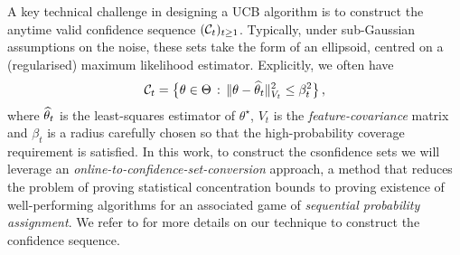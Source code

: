 A key technical challenge in designing a UCB algorithm is to construct the anytime valid confidence sequence $(\mathcal{C}_t)_{t\geq 1}$. Typically, under sub-Gaussian assumptions on the noise, these sets take the form of an ellipsoid, centred on a (regularised) maximum likelihood estimator. Explicitly, we often have
$$\mathcal{C}_t = \big\{\theta\in\Theta\,:\,\|\theta - \widehat{\theta}_{t}\|_{V_{t}}^2 \leq \beta_t^2\big\}\,,$$
where $\widehat{\theta}_t$ is the least-squares estimator of $\theta^\star$, $V_{t}$ is the \emph{feature-covariance} matrix 
and $\beta_t$ is a radius carefully chosen so that the high-probability coverage 
requirement is satisfied. In this work, to construct the csonfidence sets we will leverage an 
\emph{online-to-confidence-set-conversion} approach, a method that reduces the problem of proving statistical 
concentration bounds to proving existence of well-performing algorithms for an associated game of \emph{sequential 
probability assignment}. We refer to  for more details on our technique to construct the confidence 
sequence. 


